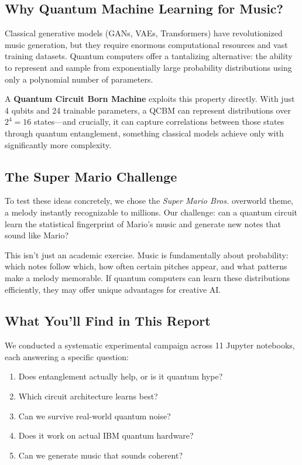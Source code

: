 \documentclass[11pt,a4paper]{article}
\begin{document}
\subsection{Why Quantum Machine Learning for Music?}

Classical generative models (GANs, VAEs, Transformers) have revolutionized music generation, but they require enormous computational resources and vast training datasets. Quantum computers offer a tantalizing alternative: the ability to represent and sample from exponentially large probability distributions using only a polynomial number of parameters.

A \textbf{Quantum Circuit Born Machine} exploits this property directly. With just 4 qubits and 24 trainable parameters, a QCBM can represent distributions over $2^4 = 16$ states---and crucially, it can capture correlations between those states through quantum entanglement, something classical models achieve only with significantly more complexity.

\subsection{The Super Mario Challenge}

To test these ideas concretely, we chose the \textit{Super Mario Bros.} overworld theme, a melody instantly recognizable to millions. Our challenge: can a quantum circuit learn the statistical fingerprint of Mario's music and generate new notes that sound like Mario?

This isn't just an academic exercise. Music is fundamentally about probability: which notes follow which, how often certain pitches appear, and what patterns make a melody memorable. If quantum computers can learn these distributions efficiently, they may offer unique advantages for creative AI.

\subsection{What You'll Find in This Report}

We conducted a systematic experimental campaign across 11 Jupyter notebooks, each answering a specific question:

\begin{enumerate}
    \item Does entanglement actually help, or is it quantum hype?
    \item Which circuit architecture learns best?
    \item Can we survive real-world quantum noise?
    \item Does it work on actual IBM quantum hardware?
    \item Can we generate music that sounds coherent?
\end{enumerate}
\end{document}
